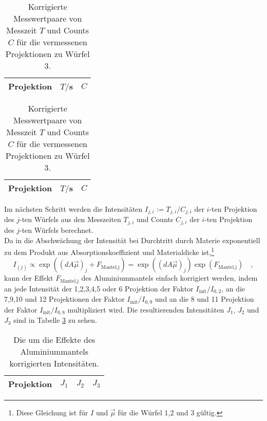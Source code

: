 \begin{table}
\centering
\begin{tabular}{ccc}
\toprule
\midrule
Projektion &$T/$s & $C$ \\
\midrule

\midrule
\bottomrule
\end{tabular}
\caption{Korrigierte Messwertpaare von Messzeit $T$ und Counts $C$ für die vermessenen 
Projektionen zu 
Würfel 2.} \label{tab:2}

\begin{tabular}{ccc}
\toprule
\midrule
Projektion &$T/$s & $C$ \\
\midrule

\midrule
\bottomrule
\end{tabular}
\caption{Korrigierte Messwertpaare von Messzeit $T$ und Counts $C$ für die vermessenen 
Projektionen zu 
Würfel 3.} \label{tab:3}
\end{table}

Im nächsten Schritt werden die Intensitäten $I_{j,i}:=T_{j,i}/C_{j,i}$ der $i$-ten Projektion des 
$j$-ten 
Würfels aus den Messzeiten $T_{j,i}$ und Counts $C_{j,i}$ der $i$-ten Projektion des 
$j$-ten Würfels berechnet.\\
Da in die Abschwächung der Intensität bei Durchtritt durch Materie exponentiell zu dem Produkt 
aus Absorptionskoeffizient und Materialdicke ist,\footnote{Diese Gleichung ist für $I$ und 
$\vec{\mu}$ für die Würfel 1,2 und 3 gültig.}
\begin{equation}
I_(j) \propto \exp\left( (d A \vec{\mu})_j + F_\text{Mantel,j} \right)=
\exp\left( (d A \vec{\mu})_j \right) \exp\left( F_\text{Mantel,j} \right) \quad ,
\end{equation} 
kann der Effekt $F_\text{Mantel,j}$ des Aluminiummantels einfach 
korrigiert werden, indem an jede Intensität der 1,2,3,4,5 oder 6 Projektion der Faktor 
$I_\text{init}/I_{0,2}$, an die 7,9,10 und 12 Projektionen der Faktor $I_\text{init}/I_{0,9}$ und 
an die 8 und 11 Projektion der Faktor $I_\text{init}/I_{0,8}$ multipliziert wird. Die 
resultierenden Intensitäten $J_1$, $J_2$ und $J_3$ sind in Tabelle \ref{tab:korr} zu sehen.
\begin{table}
\centering
\begin{tabular}{cccc}
\toprule
\midrule
Projektion &	$J_1$ & $J_2$ & $J_3$ \\
\midrule

\midrule
\bottomrule
\end{tabular}
\caption{Die um die Effekte des Aluminiummantels korrigierten Intensitäten.} \label{tab:korr}
\end{table}